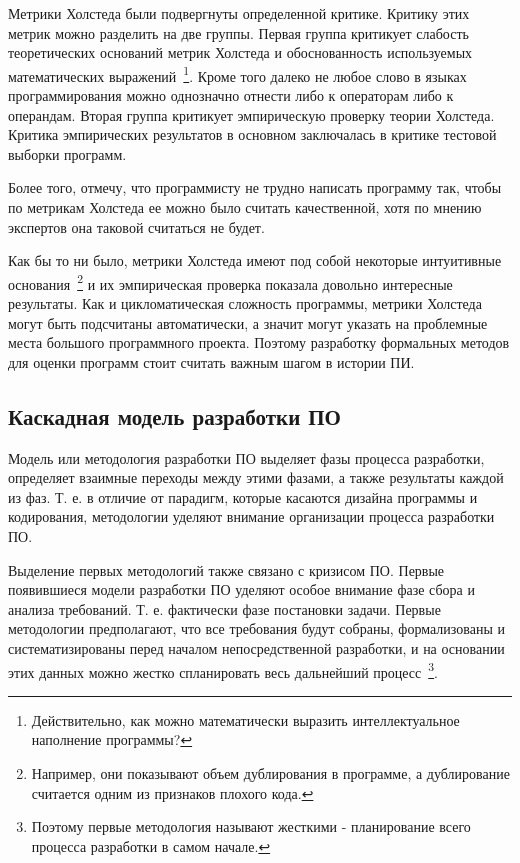 Метрики Холстеда были подвергнуты определенной критике. Критику этих метрик можно разделить на две группы. Первая группа критикует слабость теоретических оснований метрик Холстеда и обоснованность используемых математических выражений~\footnote{Действительно, как можно математически выразить интеллектуальное наполнение программы?}. Кроме того далеко не любое слово в языках программирования можно однозначно отнести либо к операторам либо к операндам. Вторая группа критикует эмпирическую проверку теории Холстеда. Критика эмпирических результатов в основном заключалась в критике тестовой выборки программ.

Более того, отмечу, что программисту не трудно написать программу так, чтобы по метрикам Холстеда ее можно было считать качественной, хотя по мнению экспертов она таковой считаться не будет.

Как бы то ни было, метрики Холстеда имеют под собой некоторые интуитивные основания~\footnote{Например, они показывают объем дублирования в программе, а дублирование считается одним из признаков плохого кода.} и их эмпирическая проверка показала довольно интересные результаты. Как и цикломатическая сложность программы, метрики Холстеда могут быть подсчитаны автоматически, а значит могут указать на проблемные места большого программного проекта. Поэтому разработку формальных методов для оценки программ стоит считать важным шагом в истории ПИ.

\subsection{Каскадная модель разработки ПО}

Модель или методология разработки ПО выделяет фазы процесса разработки, определяет взаимные переходы между этими фазами, а также результаты каждой из фаз. Т. е. в отличие от парадигм, которые касаются дизайна программы и кодирования, методологии уделяют внимание организации процесса разработки ПО.

Выделение первых методологий также связано с кризисом ПО. Первые появившиеся модели разработки ПО уделяют особое внимание фазе сбора и анализа требований. Т. е. фактически фазе постановки задачи. Первые методологии предполагают, что все требования будут собраны, формализованы и систематизированы перед началом непосредственной разработки, и на основании этих данных можно жестко спланировать весь дальнейший процесс~\footnote{Поэтому первые методология называют жесткими - планирование всего процесса разработки в самом начале.}.

